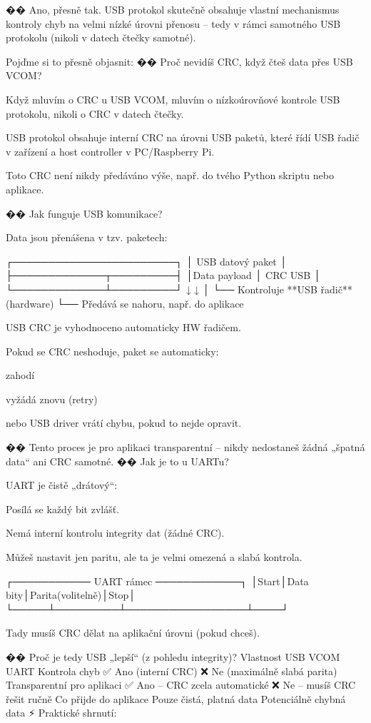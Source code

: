 �� Ano, přesně tak.
USB protokol skutečně obsahuje vlastní mechanismus kontroly chyb na velmi nízké úrovni přenosu – tedy v rámci samotného USB protokolu (nikoli v datech čtečky samotné).

Pojďme si to přesně objasnit:
�� Proč nevidíš CRC, když čteš data přes USB VCOM?

    Když mluvím o CRC u USB VCOM, mluvím o nízkoúrovňové kontrole USB protokolu, nikoli o CRC v datech čtečky.

    USB protokol obsahuje interní CRC na úrovni USB paketů, které řídí USB řadič v zařízení a host controller v PC/Raspberry Pi.

    Toto CRC není nikdy předáváno výše, např. do tvého Python skriptu nebo aplikace.

�� Jak funguje USB komunikace?

Data jsou přenášena v tzv. paketech:

┌───────────────────────┐
│   USB datový paket    │
├─────────────┬─────────┤
│Data payload │ CRC USB │
└─────────────┴─────────┘
      ↓           ↓
      │           └── Kontroluje **USB řadič** (hardware)
      └── Předává se nahoru, např. do aplikace

    USB CRC je vyhodnoceno automaticky HW řadičem.

    Pokud se CRC neshoduje, paket se automaticky:

        zahodí

        vyžádá znovu (retry)

        nebo USB driver vrátí chybu, pokud to nejde opravit.

�� Tento proces je pro aplikaci transparentní – nikdy nedostaneš žádná „špatná data“ ani CRC samotné.
�� Jak je to u UARTu?

UART je čistě „drátový“:

    Posílá se každý bit zvlášť.

    Nemá interní kontrolu integrity dat (žádné CRC).

    Můžeš nastavit jen paritu, ale ta je velmi omezená a slabá kontrola.

┌─────────── UART rámec ────────────┐
│Start│Data bity│Parita(volitelně)│Stop│
└─────┴─────────┴─────────────────┴────┘

    Tady musíš CRC dělat na aplikační úrovni (pokud chceš).

�� Proč je tedy USB „lepší“ (z pohledu integrity)?
Vlastnost	USB VCOM	UART
Kontrola chyb	✅ Ano (interní CRC)	❌ Ne (maximálně slabá parita)
Transparentní pro aplikaci	✅ Ano – CRC zcela automatické	❌ Ne – musíš CRC řešit ručně
Co přijde do aplikace	Pouze čistá, platná data	Potenciálně chybná data
⚡ Praktické shrnutí:

